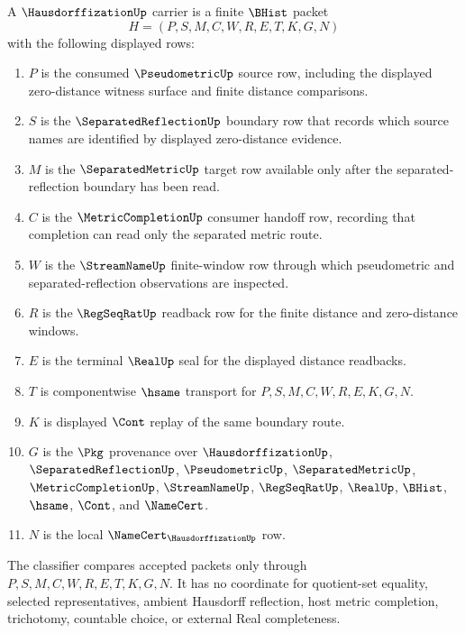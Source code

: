 \begin{definition}
\label{def:hausdorffization-carrier}
A $\HausdorffizationUp$ carrier is a finite $\BHist$ packet
$$
H=(P,S,M,C,W,R,E,T,K,G,N)
$$
with the following displayed rows:
\begin{enumerate}
\item $P$ is the consumed $\PseudometricUp$ source row, including the displayed zero-distance witness surface and finite distance comparisons.
\item $S$ is the $\SeparatedReflectionUp$ boundary row that records which source names are identified by displayed zero-distance evidence.
\item $M$ is the $\SeparatedMetricUp$ target row available only after the separated-reflection boundary has been read.
\item $C$ is the $\MetricCompletionUp$ consumer handoff row, recording that completion can read only the separated metric route.
\item $W$ is the $\StreamNameUp$ finite-window row through which pseudometric and separated-reflection observations are inspected.
\item $R$ is the $\RegSeqRatUp$ readback row for the finite distance and zero-distance windows.
\item $E$ is the terminal $\RealUp$ seal for the displayed distance readbacks.
\item $T$ is componentwise $\hsame$ transport for $P,S,M,C,W,R,E,K,G,N$.
\item $K$ is displayed $\Cont$ replay of the same boundary route.
\item $G$ is the $\Pkg$ provenance over $\HausdorffizationUp$, $\SeparatedReflectionUp$, $\PseudometricUp$, $\SeparatedMetricUp$, $\MetricCompletionUp$, $\StreamNameUp$, $\RegSeqRatUp$, $\RealUp$, $\BHist$, $\hsame$, $\Cont$, and $\NameCert$.
\item $N$ is the local $\NameCert_{\HausdorffizationUp}$ row.
\end{enumerate}
The classifier compares accepted packets only through $P,S,M,C,W,R,E,T,K,G,N$. It has no coordinate for quotient-set equality, selected representatives, ambient Hausdorff reflection, host metric completion, trichotomy, countable choice, or external Real completeness.
\end{definition}

